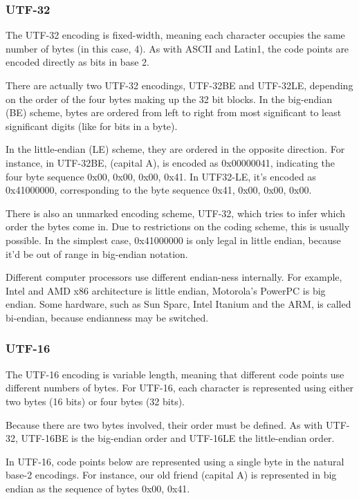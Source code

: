 \subsubsection{UTF-32}

The UTF-32 encoding is fixed-width, meaning each character occupies
the same number of bytes (in this case, 4).  As with ASCII and
Latin1, the code points are encoded directly as bits in base 2.

There are actually two UTF-32 encodings, UTF-32BE and UTF-32LE,
depending on the order of the four bytes making up the 32 bit blocks.
In the big-endian (BE) scheme, bytes are ordered from left to right
from most significant to least significant digits (like for bits in a
byte).  

In the little-endian (LE) scheme, they are ordered in the
opposite direction.  For instance, in UTF-32BE, 
(capital A), is encoded as 0x00000041, indicating the four byte
sequence 0x00, 0x00, 0x00, 0x41.  In UTF32-LE, it's encoded as
0x41000000, corresponding to the byte sequence 0x41, 0x00, 0x00, 0x00.

There is also an unmarked encoding scheme, UTF-32, which tries to
infer which order the bytes come in.  Due to restrictions on the
coding scheme, this is usually possible.  In the simplest case,
0x41000000 is only legal in little endian, because it'd be out of
range in big-endian notation.  

Different computer processors use different endian-ness
internally.  For example, Intel and AMD x86 architecture is little
endian, Motorola's PowerPC is big endian.  Some hardware, such
as Sun Sparc, Intel Itanium and the ARM, is called bi-endian, because
endianness may be switched.

\subsubsection{UTF-16}\label{section:utf-16}

The UTF-16 encoding is variable length, meaning that different code
points use different numbers of bytes.  For UTF-16, each character is
represented using either two bytes (16 bits) or four bytes (32 bits).

Because there are two bytes involved, their order must be defined.  As
with UTF-32, UTF-16BE is the big-endian order and UTF-16LE the
little-endian order.

In UTF-16, code points below  are represented using a
single byte in the natural base-2 encodings.  For instance, our old
friend  (capital A) is represented in big endian as
the sequence of bytes 0x00, 0x41.  


